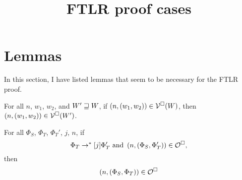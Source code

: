 \documentclass[a4paper]{article}
\title{FTLR proof cases}
\begin{document}
\maketitle
\section{Lemmas}
In this section, I have listed lemmas that seem to be necessary for the FTLR proof.
\begin{lemma}
  For all $n$, $w_1$, $w_2$, and $W' \sqsupseteq W$, if $\left(n,(w_1,w_2)\right) \in \mathcal{V}^{\square}(W)$, then $\left(n,(w_1,w_2)\right) \in \mathcal{V}^{\square}(W')$.
\end{lemma}

\begin{lemma}
  For all $\Phi_S$, $\Phi_T$, $\Phi_T'$, $j$, $n$, if
\[
  \Phi_T \rightarrow^*[j] \Phi_T' \text{ and } \left(n,(\Phi_S,\Phi_T')\right) \in \mathcal{O}^{\square},
\]
then
\[
  \left(n,(\Phi_S,\Phi_T)\right) \in \mathcal{O}^{\square}
\]
\end{lemma}
\end{document}
